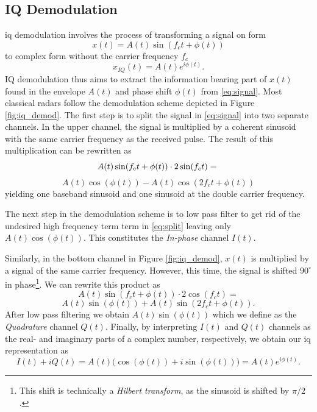 
\begin{appendices}

\chapter{IQ Demodulation}\label{apx:iq}

\gls{iq} demodulation involves the process of transforming a signal on form 
\begin{equation}\label{eq:signal}
	x(t)=A(t)\sin(f_c t+\phi(t))
\end{equation}
to complex form without the carrier frequency $f_c$ \citep{lee_1991}
\begin{equation}
	x_{IQ}(t) = A(t)e^{i\phi(t)}.
\end{equation}
IQ demodulation thus aims to extract the information bearing part of $x(t)$ found in the envelope $A(t)$ and phase shift $\phi(t)$ from \eqref{eq:signal}. Most classical radars follow the demodulation scheme depicted in Figure \ref{fig:iq_demod}. The first step is to split the signal in \eqref{eq:signal} into two separate channels. In the upper channel, the signal is multiplied by a coherent sinusoid with the same carrier frequency as the received pulse. The result of this multiplication can be rewritten as
\begin{equation}
	 A(t)\sin(f_c t+\phi(t))\cdot 2\sin(f_c t) = \\
\end{equation}
\begin{equation}\label{eq:split}
	A(t)\cos(\phi(t))-A(t)\cos(2f_c t+\phi(t))
\end{equation}
yielding one baseband sinusoid and one sinusoid at the double carrier frequency. 

The next step in the demodulation scheme is to low pass filter to get rid of the undesired high frequency term term in \eqref{eq:split} leaving only $A(t)\cos(\phi(t))$. This constitutes the \emph{In-phase} channel $I(t)$.

	Similarly, in the bottom channel in Figure \ref{fig:iq_demod}, $x(t)$ is multiplied by a signal of the same carrier frequency. However, this time, the signal is shifted $90^\circ$ in phase\footnote{This shift is technically a \emph{Hilbert transform}, as the sinusoid is shifted by $\pi/2$.}. We can rewrite this product as
\begin{equation}
	 A(t)\sin(f_c t+\phi(t))\cdot 2\cos(f_c t) = 
\end{equation}
\begin{equation}\label{eq:split2}
 	 A(t)\sin(\phi(t))+A(t)\sin(2f_c t+\phi(t)).
\end{equation}
After low pass filtering we obtain $A(t)\sin(\phi(t))$ which we define as the \emph{Quadrature} channel $Q(t)$. Finally, by interpreting $I(t)$ and $Q(t)$ channels as the real- and imaginary parts of a complex number, respectively, we obtain our \gls{iq} representation as
\begin{equation}
	I(t)+iQ(t)=A(t)\Big(\cos(\phi(t))+i\sin(\phi(t))\Big)=A(t)e^{i\phi(t)}.
\end{equation}


\end{appendices}
